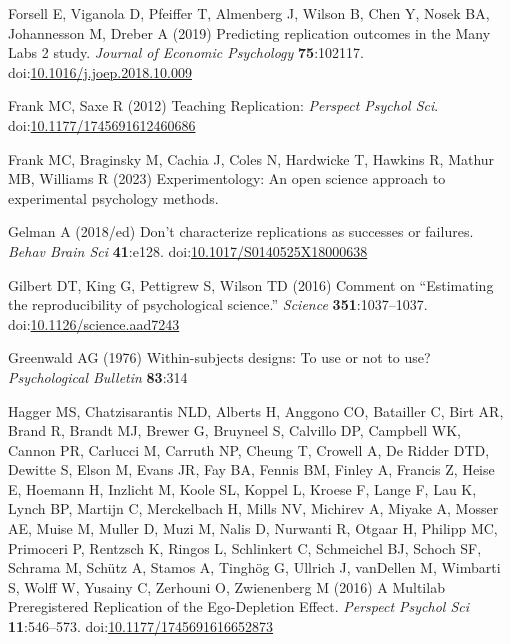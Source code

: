 \documentclass[
  english,
  a4paper,
]{article}
\newlength{\cslhangindent}
\newlength{\cslentryspacingunit} %
\newenvironment{CSLReferences}[2] %
 {%
  \setlength{\parindent}{0pt}
  \ifodd #1
  \let\oldpar\par
  \def\par{\hangindent=\cslhangindent\oldpar}
  \fi
  \setlength{\parskip}{#2\cslentryspacingunit}
 }%
 {}
\begin{document}
\begin{CSLReferences}{1}{0}
\leavevmode{}%
Forsell E, Viganola D, Pfeiffer T, Almenberg J, Wilson B, Chen Y, Nosek BA, Johannesson M, Dreber A (2019) Predicting replication outcomes in the {Many Labs} 2 study. \emph{Journal of Economic Psychology} \textbf{75}:102117. doi:\href{https://doi.org/10.1016/j.joep.2018.10.009}{10.1016/j.joep.2018.10.009}

\leavevmode{}%
Frank MC, Saxe R (2012) Teaching {Replication}: \emph{Perspect Psychol Sci}. doi:\href{https://doi.org/10.1177/1745691612460686}{10.1177/1745691612460686}

\leavevmode{}%
Frank MC, Braginsky M, Cachia J, Coles N, Hardwicke T, Hawkins R, Mathur MB, Williams R (2023) Experimentology: An open science approach to experimental psychology methods.

\leavevmode{}%
Gelman A (2018/ed) Don't characterize replications as successes or failures. \emph{Behav Brain Sci} \textbf{41}:e128. doi:\href{https://doi.org/10.1017/S0140525X18000638}{10.1017/S0140525X18000638}

\leavevmode{}%
Gilbert DT, King G, Pettigrew S, Wilson TD (2016) Comment on {``{Estimating} the reproducibility of psychological science.''} \emph{Science} \textbf{351}:1037--1037. doi:\href{https://doi.org/10.1126/science.aad7243}{10.1126/science.aad7243}

\leavevmode{}%
Greenwald AG (1976) Within-subjects designs: To use or not to use? \emph{Psychological Bulletin} \textbf{83}:314

\leavevmode{}%
Hagger MS, Chatzisarantis NLD, Alberts H, Anggono CO, Batailler C, Birt AR, Brand R, Brandt MJ, Brewer G, Bruyneel S, Calvillo DP, Campbell WK, Cannon PR, Carlucci M, Carruth NP, Cheung T, Crowell A, De Ridder DTD, Dewitte S, Elson M, Evans JR, Fay BA, Fennis BM, Finley A, Francis Z, Heise E, Hoemann H, Inzlicht M, Koole SL, Koppel L, Kroese F, Lange F, Lau K, Lynch BP, Martijn C, Merckelbach H, Mills NV, Michirev A, Miyake A, Mosser AE, Muise M, Muller D, Muzi M, Nalis D, Nurwanti R, Otgaar H, Philipp MC, Primoceri P, Rentzsch K, Ringos L, Schlinkert C, Schmeichel BJ, Schoch SF, Schrama M, Schütz A, Stamos A, Tinghög G, Ullrich J, vanDellen M, Wimbarti S, Wolff W, Yusainy C, Zerhouni O, Zwienenberg M (2016) A {Multilab Preregistered Replication} of the {Ego-Depletion Effect}. \emph{Perspect Psychol Sci} \textbf{11}:546--573. doi:\href{https://doi.org/10.1177/1745691616652873}{10.1177/1745691616652873}


\end{CSLReferences}
\end{document}
